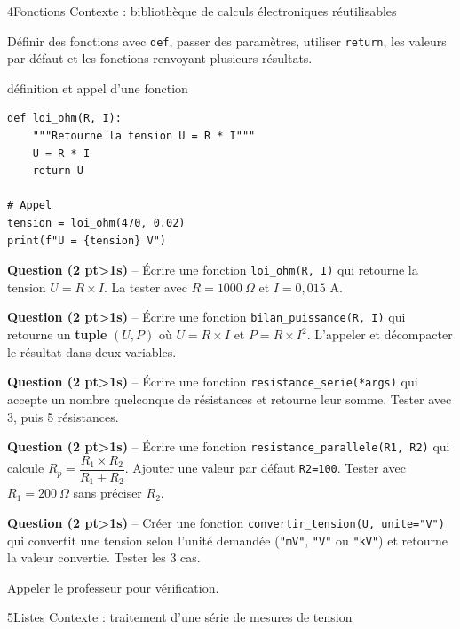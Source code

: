 \documentclass[11pt,a4paper]{article}
\newcommand{\cadreblanc}[1]{%
  \medskip\framebox[\linewidth][c]{\rule{0mm}{#1mm}}\par\medskip}
\newcounter{qnum}
\newcommand{\resetq}{\setcounter{qnum}{0}}
\newcommand{\q}[2]{%
  \stepcounter{qnum}%
  \noindent\textbf{Question \theqnum{} \normalfont(#2 pt\ifnum#2>1s\fi)} -- #1\par\smallskip}
\begin{document}
\clearpage
\resetq
\begin{tptitre}{4}{Fonctions}
  Contexte : bibliothèque de calculs électroniques réutilisables
\end{tptitre}

\begin{objectifbox}{}
  Définir des fonctions avec \texttt{def}, passer des paramètres, utiliser \texttt{return}, les valeurs par défaut et les fonctions renvoyant plusieurs résultats.
\end{objectifbox}

\begin{codebox}{définition et appel d'une fonction}
\begin{lstlisting}
def loi_ohm(R, I):
    """Retourne la tension U = R * I"""
    U = R * I
    return U

# Appel
tension = loi_ohm(470, 0.02)
print(f"U = {tension} V")
\end{lstlisting}
\end{codebox}

\q{Écrire une fonction \texttt{loi\_ohm(R, I)} qui retourne la tension $U = R \times I$. La tester avec $R = 1000\ \Omega$ et $I = 0{,}015$ A.}{2}
\cadreblanc{22}

\q{Écrire une fonction \texttt{bilan\_puissance(R, I)} qui retourne un \textbf{tuple} $(U, P)$ où $U = R \times I$ et $P = R \times I^2$. L'appeler et décompacter le résultat dans deux variables.}{2}
\cadreblanc{22}

\q{Écrire une fonction \texttt{resistance\_serie(*args)} qui accepte un nombre quelconque de résistances et retourne leur somme. Tester avec 3, puis 5 résistances.}{2}
\cadreblanc{22}

\q{Écrire une fonction \texttt{resistance\_parallele(R1, R2)} qui calcule $R_p = \dfrac{R_1 \times R_2}{R_1 + R_2}$. Ajouter une valeur par défaut \texttt{R2=100}. Tester avec $R_1 = 200\ \Omega$ sans préciser $R_2$.}{2}
\cadreblanc{22}

\q{Créer une fonction \texttt{convertir\_tension(U, unite="V")} qui convertit une tension selon l'unité demandée (\texttt{"mV"}, \texttt{"V"} ou \texttt{"kV"}) et retourne la valeur convertie. Tester les 3 cas.}{2}
\cadreblanc{24}

\begin{appelbox}
  \centering Appeler le professeur pour vérification.
\end{appelbox}

\clearpage
\resetq
\begin{tptitre}{5}{Listes}
  Contexte : traitement d'une série de mesures de tension
\end{tptitre}
\end{document}
